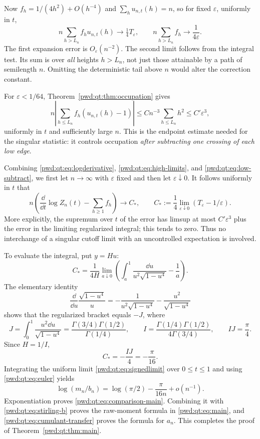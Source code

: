 \documentclass[11pt,letterpaper]{article}
\numberwithin{equation}{section}
\theoremstyle{remark}\newtheorem{remark}[theorem]{Remark}
\begin{document}
Now $f_h=1/(4h^2)+O(h^{-4})$ and $\sum_hu_{n,t}(h)=n$, so for fixed $\varepsilon$, uniformly in $t$,
\begin{equation}\label{pwd:qt:eq:high-limits}
 n\sum_{h>L_n}f_hu_{n,t}(h)\longrightarrow\tfrac14T_\varepsilon,
 \qquad n\sum_{h>L_n}f_h\longrightarrow\frac1{4\varepsilon}.
\end{equation}
The first expansion error is $O_\varepsilon(n^{-2})$. The second limit follows from the integral test. Its sum is over \emph{all} heights $h>L_n$, not just those attainable by a path of semilength $n$. Omitting the deterministic tail above $n$ would alter the correction constant.

For $\varepsilon<1/64$, Theorem~\ref{pwd:qt:thm:occupation} gives
\begin{equation}\label{pwd:qt:eq:low-subtract}
 n\left|\sum_{h\le L_n}f_h(u_{n,t}(h)-1)\right|
 \le Cn^{-3}\sum_{h\le L_n}h^2\le C'\varepsilon^3,
\end{equation}
uniformly in $t$ and sufficiently large $n$. This is the endpoint estimate needed for the singular statistic: it controls occupation \emph{after subtracting one crossing of each low edge}.

Combining \eqref{pwd:qt:eq:logderivative}, \eqref{pwd:qt:eq:high-limits}, and \eqref{pwd:qt:eq:low-subtract}, we first let $n\to\infty$ with $\varepsilon$ fixed and then let $\varepsilon\downarrow0$. It follows uniformly in $t$ that
\begin{equation}\label{pwd:qt:eq:signedlimit}
 n\left(\frac{\dd}{\dd t}\log Z_n(t)-\sum_{h\ge1}f_h\right)
 \longrightarrow C_*,\qquad
 C_*:=\frac14\lim_{\varepsilon\downarrow0}
               (T_\varepsilon-1/\varepsilon).
\end{equation}
More explicitly, the supremum over $t$ of the error has limsup at most $C'\varepsilon^3$ plus the error in the limiting regularized integral; this tends to zero. Thus no interchange of a singular cutoff limit with an uncontrolled expectation is involved.

To evaluate the integral, put $y=Hu$:
\[
 C_* =\frac1{4H}\lim_{a\downarrow0}
 \left(\int_a^1\frac{\dd u}{u^2\sqrt{1-u^4}}-\frac1a\right).
\]
The elementary identity
\[
 \frac{\dd}{\dd u}\frac{\sqrt{1-u^4}}u
 =-\frac1{u^2\sqrt{1-u^4}}-\frac{u^2}{\sqrt{1-u^4}}
\]
shows that the regularized bracket equals $-J$, where
\[
 J=\int_0^1\frac{u^2\dd u}{\sqrt{1-u^4}}
   =\frac{\Gamma(3/4)\Gamma(1/2)}{\Gamma(1/4)},\qquad
 I=\frac{\Gamma(1/4)\Gamma(1/2)}{4\Gamma(3/4)},\qquad IJ=\frac\pi4.
\]
Since $H=1/I$,
\begin{equation}\label{pwd:qt:eq:cstar}
 C_*=-\frac{IJ}4=-\frac\pi{16}.
\end{equation}
Integrating the uniform limit \eqref{pwd:qt:eq:signedlimit} over $0\le t\le1$ and using \eqref{pwd:qt:eq:euler} yields
\[
 \log(m_n/b_n)=\log(\pi/2)-\frac\pi{16n}+o(n^{-1}).
\]
Exponentiation proves \eqref{pwd:qt:eq:comparison-main}. Combining it with \eqref{pwd:qt:eq:stirling-b} proves the raw-moment formula in \eqref{pwd:qt:eq:main}, and \eqref{pwd:qt:eq:cumulant-transfer} proves the formula for $a_n$. This completes the proof of Theorem~\ref{pwd:qt:thm:main}.
\end{document}
